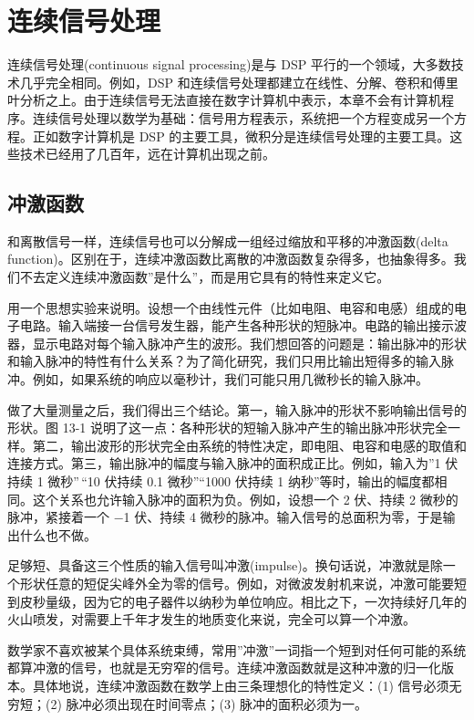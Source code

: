 
\chapter{连续信号处理}\label{ch-13}

连续信号处理(continuous signal processing)是与 DSP
平行的一个领域，大多数技术几乎完全相同。例如，DSP
和连续信号处理都建立在线性、分解、卷积和傅里叶分析之上。由于连续信号无法直接在数字计算机中表示，本章不会有计算机程序。连续信号处理以数学为基础：信号用方程表示，系统把一个方程变成另一个方程。正如数字计算机是
DSP
的主要工具，微积分是连续信号处理的主要工具。这些技术已经用了几百年，远在计算机出现之前。

\section{冲激函数}

和离散信号一样，连续信号也可以分解成一组经过缩放和平移的冲激函数(delta
function)。区别在于，连续冲激函数比离散的冲激函数复杂得多，也抽象得多。我们不去定义连续冲激函数''是什么''，而是用它具有的特性来定义它。

用一个思想实验来说明。设想一个由线性元件（比如电阻、电容和电感）组成的电子电路。输入端接一台信号发生器，能产生各种形状的短脉冲。电路的输出接示波器，显示电路对每个输入脉冲产生的波形。我们想回答的问题是：输出脉冲的形状和输入脉冲的特性有什么关系？为了简化研究，我们只用比输出短得多的输入脉冲。例如，如果系统的响应以毫秒计，我们可能只用几微秒长的输入脉冲。

做了大量测量之后，我们得出三个结论。第一，输入脉冲的形状不影响输出信号的形状。图
13-1
说明了这一点：各种形状的短输入脉冲产生的输出脉冲形状完全一样。第二，输出波形的形状完全由系统的特性决定，即电阻、电容和电感的取值和连接方式。第三，输出脉冲的幅度与输入脉冲的面积成正比。例如，输入为''1
伏持续 1 微秒''\,``10 伏持续 0.1 微秒''``1000 伏持续 1
纳秒''等时，输出的幅度都相同。这个关系也允许输入脉冲的面积为负。例如，设想一个
2 伏、持续 2 微秒的脉冲，紧接着一个 −1 伏、持续 4
微秒的脉冲。输入信号的总面积为零，于是输出什么也不做。

足够短、具备这三个性质的输入信号叫冲激(impulse)。换句话说，冲激就是除一个形状任意的短促尖峰外全为零的信号。例如，对微波发射机来说，冲激可能要短到皮秒量级，因为它的电子器件以纳秒为单位响应。相比之下，一次持续好几年的火山喷发，对需要上千年才发生的地质变化来说，完全可以算一个冲激。

数学家不喜欢被某个具体系统束缚，常用''冲激''一词指一个短到对任何可能的系统都算冲激的信号，也就是无穷窄的信号。连续冲激函数就是这种冲激的归一化版本。具体地说，连续冲激函数在数学上由三条理想化的特性定义：(1)
信号必须无穷短；(2) 脉冲必须出现在时间零点；(3) 脉冲的面积必须为一。


